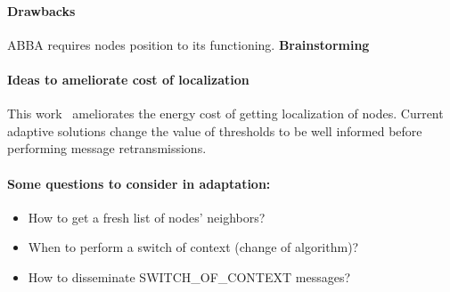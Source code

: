 {\paragraph{Drawbacks} ABBA requires nodes position to its functioning. 
\textbf{Brainstorming}
\paragraph{Ideas to ameliorate cost of localization}
This work~\cite{enloc} ameliorates the energy cost of getting localization of nodes.
Current adaptive solutions change the value of thresholds to be well informed before performing message retransmissions.
\paragraph{Some questions to consider in adaptation:}
\begin{itemize}
	\item How to get a fresh list of nodes' neighbors?
	\item When to perform a switch of context (change of algorithm)?
	\item How to disseminate SWITCH\_OF\_CONTEXT messages?
\end{itemize}
}